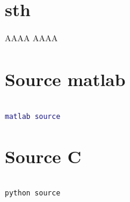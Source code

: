 
\begin{appendices}

\section{sth}

AAAA
AAAA

\section{Source matlab}

\begin{lstlisting}[language=matlab]

matlab source

\end{lstlisting}


\section{Source C}

\begin{lstlisting}[language=python]

python source

\end{lstlisting}


\end{appendices}